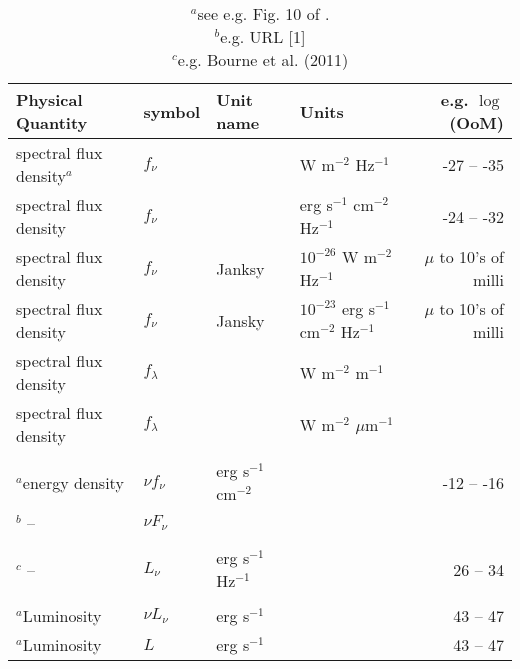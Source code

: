 \documentclass[11pt,a4paper]{article}
\begin{document}
\begin{table*}
  \begin{center}
    \setlength{\tabcolsep}{4pt}
    \begin{tabular}{llllr}
      \hline
      \hline
      Physical Quantity & symbol & Unit name & Units & e.g. $\log$(OoM)   \\
      \hline
      spectral flux density$^{a}$ &  $f_{\nu}$        &             & W                  m$^{-2}$ Hz$^{-1}$                  & -27 -- -35 \\
      spectral flux density          &  $f_{\nu}$        &             & erg s$^{-1}$ cm$^{-2}$ Hz$^{-1}$                  & -24 -- -32 \\
      spectral flux density          &  $f_{\nu}$        & Janksy  & $10^{-26}$ W     m$^{-2}$ Hz$^{-1}$              & $\mu$ to 10's of milli \\
      spectral flux density          &  $f_{\nu}$        & Jansky  & $10^{-23}$ erg s$^{-1}$ cm$^{-2}$ Hz$^{-1}$ & $\mu$ to 10's of milli \\
      spectral flux density          &  $f_{\lambda}$  &             &  W                  m$^{-2}$ m$^{-1}$                  &  \\
      spectral flux density          &  $f_{\lambda}$  &             &  W                  m$^{-2}$ $\mu$m$^{-1}$                  &  \\
                                                &                       &             &                        & \\
      $^{a}$energy density         & $\nu f_{\nu}$   &  erg s$^{-1}$ cm$^{-2}$       &        & -12 -- -16 \\
     $^{b}$ --                            & $\nu F_{\nu}$ &                                            &        &      \\
                                                &                       &             &                        & \\
     $^{c}$ --                            &        $L_{\nu}$ &  erg s$^{-1}$ Hz$^{-1}$       &        &    26 -- 34  \\
                                                &                       &             &                        & \\

     $^{a}$Luminosity              &  $\nu L_{\nu}$ &  erg s$^{-1}$                        &       &   43 -- 47 \\
     $^{a}$Luminosity              &  $L$ &  erg s$^{-1}$                        &       &   43 -- 47 \\
      \hline
      \hline
   \end{tabular}
    \caption{$^{a}$see e.g. Fig. 10 of \citet{Richards06b}.\\
      $^{b}$e.g. URL [1]\\
      $^{c}$e.g. Bourne et al. (2011)
}
     \label{tab:units_overview}
  \end{center}
\end{table*}
\end{document}
